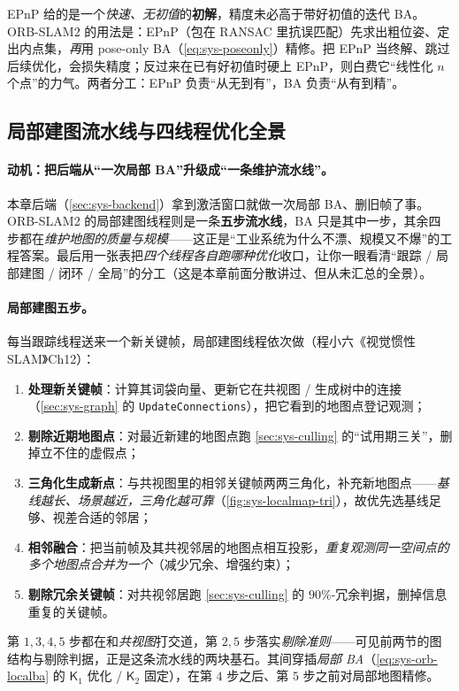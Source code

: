 \begin{pitfall}
EPnP 给的是一个\emph{快速、无初值}的\textbf{初解}，精度未必高于带好初值的迭代 BA。ORB-SLAM2 的用法是：EPnP（包在 RANSAC 里抗误匹配）先求出粗位姿、定出内点集，\emph{再}用 pose-only BA（\cref{eq:sys-poseonly}）精修。把 EPnP 当终解、跳过后续优化，会损失精度；反过来在已有好初值时硬上 EPnP，则白费它“线性化 $n$ 个点”的力气。两者分工：EPnP 负责“从无到有”，BA 负责“从有到精”。
\end{pitfall}

\subsection{局部建图流水线与四线程优化全景}
\label{sec:sys-localmapping-orb}

\paragraph{动机：把后端从“一次局部 BA”升级成“一条维护流水线”。}
本章后端（\cref{sec:sys-backend}）拿到激活窗口就做一次局部 BA、删旧帧了事。ORB-SLAM2 的局部建图线程则是一条\textbf{五步流水线}，BA 只是其中一步，其余四步都在\emph{维护地图的质量与规模}——这正是“工业系统为什么不漂、规模又不爆”的工程答案。最后用一张表把\emph{四个线程各自跑哪种优化}收口，让你一眼看清“跟踪 / 局部建图 / 闭环 / 全局”的分工（这是本章前面分散讲过、但从未汇总的全景）。

\paragraph{局部建图五步。}
每当跟踪线程送来一个新关键帧，局部建图线程依次做（程小六《视觉惯性 SLAM》Ch12）：
\begin{enumerate}
  \item \textbf{处理新关键帧}：计算其词袋向量、更新它在共视图 / 生成树中的连接（\cref{sec:sys-graph} 的 \texttt{UpdateConnections}），把它看到的地图点登记观测；
  \item \textbf{剔除近期地图点}：对最近新建的地图点跑 \cref{sec:sys-culling} 的“试用期三关”，删掉立不住的虚假点；
  \item \textbf{三角化生成新点}：与共视图里的相邻关键帧两两三角化，补充新地图点——\emph{基线越长、场景越近，三角化越可靠}（\cref{fig:sys-localmap-tri}），故优先选基线足够、视差合适的邻居；
  \item \textbf{相邻融合}：把当前帧及其共视邻居的地图点相互投影，\emph{重复观测同一空间点的多个地图点合并为一个}（减少冗余、增强约束）；
  \item \textbf{剔除冗余关键帧}：对共视邻居跑 \cref{sec:sys-culling} 的 $90\%$-冗余判据，删掉信息重复的关键帧。
\end{enumerate}
第 $1,3,4,5$ 步都在和\emph{共视图}打交道，第 $2,5$ 步落实\emph{剔除准则}——可见前两节的图结构与剔除判据，正是这条流水线的两块基石。其间穿插\emph{局部 BA}（\cref{eq:sys-orb-localba} 的 $\mathsf{K}_1$ 优化 / $\mathsf{K}_2$ 固定），在第 $4$ 步之后、第 $5$ 步之前对局部地图精修。

